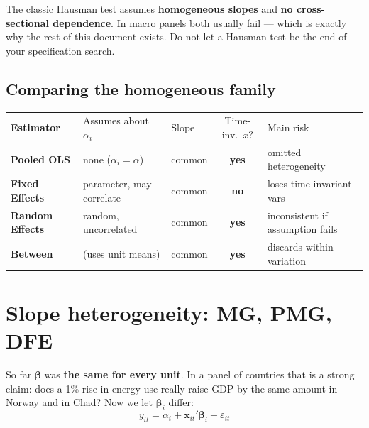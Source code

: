 \documentclass[11pt,a4paper]{article}
\newcommand{\bbeta}{\boldsymbol{\beta}}
\newcommand{\bx}{\mathbf{x}}
\newcommand{\YES}{\textcolor{cgreen}{\textbf{yes}}}
\newcommand{\NO}{\textcolor{cred}{\textbf{no}}}
\begin{document}
\begin{avoidbox}
The classic Hausman test assumes \textbf{homogeneous slopes} and \textbf{no cross-sectional
dependence}. In macro panels both usually fail --- which is exactly why the rest of this document
exists. Do not let a Hausman test be the end of your specification search.
\end{avoidbox}

\subsection{Comparing the homogeneous family}
\begin{center}
\begin{tabular}{@{}>{\bfseries}l l l c l@{}}
\rowcolor{cblue}\color{white}Estimator & \color{white}Assumes about $\alpha_i$ & \color{white}Slope &
\color{white}Time-inv.\ $x$? & \color{white}Main risk\\
Pooled OLS & none ($\alpha_i=\alpha$) & common & \YES & omitted heterogeneity\\
Fixed Effects & parameter, may correlate & common & \NO & loses time-invariant vars\\
Random Effects & random, uncorrelated & common & \YES & inconsistent if assumption fails\\
Between & (uses unit means) & common & \YES & discards within variation\\
\end{tabular}
\end{center}

\section{Slope heterogeneity: MG, PMG, DFE}

\begin{idea}
So far $\bbeta$ was \textbf{the same for every unit}. In a panel of countries that is a strong
claim: does a 1\% rise in energy use really raise GDP by the same amount in Norway and in Chad?
Now we let $\bbeta_i$ differ:
\[ y_{it}=\alpha_i+\bx_{it}'\bbeta_i+\varepsilon_{it} \]
\end{idea}
\end{document}
